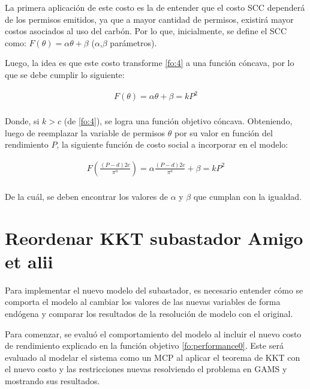 La primera aplicación de este costo es la de entender que el costo SCC dependerá de los permisos emitidos, ya que a mayor cantidad de permisos, existirá mayor costos asociados al uso del carbón. Por lo que, inicialmente, se  define el SCC como: $F(\theta)= \alpha\theta + \beta$ ($\alpha$,$\beta$ parámetros). 
\vspace{2.5mm}

Luego, la idea es que este costo transforme \ref{fo:4} a una función cóncava, por lo que se debe cumplir lo siguiente:

\begin{equation}
\begin{array}{rrclcl}
    F(\theta)= \alpha\theta + \beta = kP^2 \label{fo:5}\\
\end{array}
\end{equation}

Donde, si $k>c$ (de \ref{fo:4}), se logra una función objetivo cóncava. Obteniendo, luego de reemplazar la variable de permisos $\theta$ por su valor en función del rendimiento $P$, la siguiente función de costo social a incorporar en el modelo:

\begin{equation}
\begin{array}{rrclcl}
    F(\frac{(P-d)2c}{\pi^a})= \alpha\frac{(P-d)2c}{\pi^a} + \beta = kP^2 \label{fo:5}\\
\end{array}
\end{equation}

De la cuál, se deben encontrar los valores de $\alpha$ y $\beta$ que cumplan con la igualdad.

\section{Reordenar KKT subastador Amigo et alii}

Para implementar el nuevo modelo del subastador, es necesario entender cómo se comporta el modelo al cambiar los valores de las nuevas variables de forma endógena y comparar los resultados de la resolución de modelo con el original. 
\vspace{2.5mm}

Para comenzar, se evaluó el comportamiento del modelo al incluir el nuevo costo de rendimiento explicado en la función objetivo \ref{fo:performance0}. Este será evaluado al modelar el sistema como un MCP al aplicar el teorema de KKT con el nuevo costo y las restricciones nuevas resolviendo el problema en GAMS y mostrando sus resultados. 

